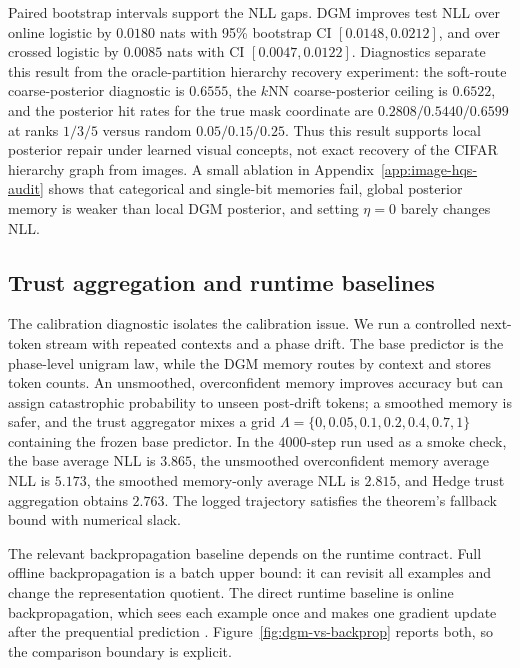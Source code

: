 Paired bootstrap intervals support the NLL gaps. DGM improves test NLL over
online logistic by $0.0180$ nats with 95\% bootstrap CI $[0.0148,0.0212]$, and
over crossed logistic by $0.0085$ nats with CI $[0.0047,0.0122]$. Diagnostics
separate this result from the oracle-partition hierarchy recovery experiment:
the soft-route coarse-posterior diagnostic is $0.6555$, the $k$NN
coarse-posterior ceiling is $0.6522$, and the posterior hit rates for the true
mask coordinate are $0.2808/0.5440/0.6599$ at ranks $1/3/5$ versus random
$0.05/0.15/0.25$. Thus this result supports local posterior repair under
learned visual concepts, not exact recovery of the CIFAR hierarchy graph from
images. A small ablation in Appendix~\ref{app:image-hqs-audit} shows that
categorical and single-bit memories fail, global posterior memory is weaker
than local DGM posterior, and setting $\eta=0$ barely changes NLL.

\subsection{Trust aggregation and runtime baselines}

The calibration diagnostic isolates the calibration issue. We run a controlled
next-token stream with repeated contexts and a phase drift. The base predictor
is the phase-level unigram law, while the DGM memory routes by context and
stores token counts. An unsmoothed, overconfident memory improves accuracy but
can assign catastrophic probability to unseen post-drift tokens; a smoothed
memory is safer, and the trust aggregator mixes a grid
$\Lambda=\{0,0.05,0.1,0.2,0.4,0.7,1\}$ containing the frozen base predictor.
In the 4000-step run used as a smoke check, the base average NLL is $3.865$,
the unsmoothed overconfident memory average NLL is $5.173$, the smoothed
memory-only average NLL is $2.815$, and Hedge trust aggregation obtains
$2.763$. The logged trajectory satisfies the theorem's fallback bound with
numerical slack.

The relevant backpropagation baseline depends on the runtime contract. Full
offline backpropagation is a batch upper bound: it can revisit all examples and
change the representation quotient. The direct runtime baseline is online
backpropagation, which sees each example once and makes one gradient update
after the prequential prediction
\citep{rumelhart1986learning,zinkevich2003online,shalev2012online}.
Figure~\ref{fig:dgm-vs-backprop} reports both, so the comparison boundary is
explicit.

